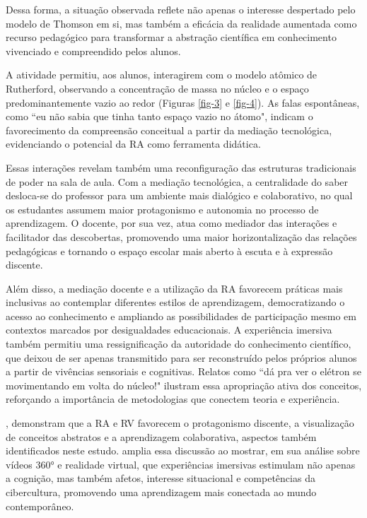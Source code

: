 \documentclass[portuguese]{textolivre}
\begin{document}
Dessa forma, a situação observada reflete não apenas o interesse despertado pelo modelo de Thomson em si, mas também a eficácia da realidade aumentada como recurso pedagógico para transformar a abstração científica em conhecimento vivenciado e compreendido pelos alunos.

A atividade permitiu, aos alunos, interagirem com o modelo atômico de Rutherford, observando a concentração de massa no núcleo e o espaço predominantemente vazio ao redor (Figuras \ref{fig-3} e \ref{fig-4}). As falas espontâneas, como ``eu não sabia que tinha tanto espaço vazio no átomo", indicam o favorecimento da compreensão conceitual a partir da mediação tecnológica, evidenciando o potencial da RA como ferramenta didática.

Essas interações revelam também uma reconfiguração das estruturas tradicionais de poder na sala de aula. Com a mediação tecnológica, a centralidade do saber desloca-se do professor para um ambiente mais dialógico e colaborativo, no qual os estudantes assumem maior protagonismo e autonomia no processo de aprendizagem. O docente, por sua vez, atua como mediador das interações e facilitador das descobertas, promovendo uma maior horizontalização das relações pedagógicas e tornando o espaço escolar mais aberto à escuta e à expressão discente.

Além disso, a mediação docente e a utilização da RA favorecem práticas mais inclusivas ao contemplar diferentes estilos de aprendizagem, democratizando o acesso ao conhecimento e ampliando as possibilidades de participação mesmo em contextos marcados por desigualdades educacionais. A experiência imersiva também permitiu uma ressignificação da autoridade do conhecimento científico, que deixou de ser apenas transmitido para ser reconstruído pelos próprios alunos a partir de vivências sensoriais e cognitivas. Relatos como ``dá pra ver o elétron se movimentando em volta do núcleo!" ilustram essa apropriação ativa dos conceitos, reforçando a importância de metodologias que conectem teoria e experiência.

\textcite{santos2023}, \textcite{tito2022} demonstram que a RA e RV favorecem o protagonismo discente, a visualização de conceitos abstratos e a aprendizagem colaborativa, aspectos também identificados neste estudo. \textcite{freitas2022} amplia essa discussão ao mostrar, em sua análise sobre vídeos 360° e realidade virtual, que experiências imersivas estimulam não apenas a cognição, mas também afetos, interesse situacional e competências da cibercultura, promovendo uma aprendizagem mais conectada ao mundo contemporâneo.
\end{document}

